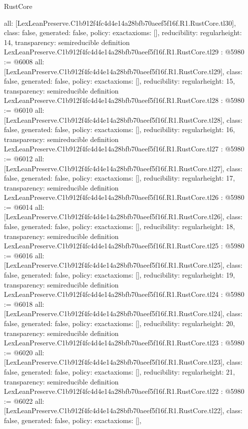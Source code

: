 \begin{lexlean}{RustCore}
\begin{coremodule}
{  all: [LexLeanPreserve.C1b912f4fc4d4e14a28bfb70aeef5f16f.R1.RustCore.tl30],
  class: false,
  generated: false,
  policy: exact{axioms: []},
  reducibility: regular{height: 14},
  transparency: semireducible
}
definition LexLeanPreserve.C1b912f4fc4d4e14a28bfb70aeef5f16f.R1.RustCore.tl29 : @5980 := @6008 {
  all: [LexLeanPreserve.C1b912f4fc4d4e14a28bfb70aeef5f16f.R1.RustCore.tl29],
  class: false,
  generated: false,
  policy: exact{axioms: []},
  reducibility: regular{height: 15},
  transparency: semireducible
}
definition LexLeanPreserve.C1b912f4fc4d4e14a28bfb70aeef5f16f.R1.RustCore.tl28 : @5980 := @6010 {
  all: [LexLeanPreserve.C1b912f4fc4d4e14a28bfb70aeef5f16f.R1.RustCore.tl28],
  class: false,
  generated: false,
  policy: exact{axioms: []},
  reducibility: regular{height: 16},
  transparency: semireducible
}
definition LexLeanPreserve.C1b912f4fc4d4e14a28bfb70aeef5f16f.R1.RustCore.tl27 : @5980 := @6012 {
  all: [LexLeanPreserve.C1b912f4fc4d4e14a28bfb70aeef5f16f.R1.RustCore.tl27],
  class: false,
  generated: false,
  policy: exact{axioms: []},
  reducibility: regular{height: 17},
  transparency: semireducible
}
definition LexLeanPreserve.C1b912f4fc4d4e14a28bfb70aeef5f16f.R1.RustCore.tl26 : @5980 := @6014 {
  all: [LexLeanPreserve.C1b912f4fc4d4e14a28bfb70aeef5f16f.R1.RustCore.tl26],
  class: false,
  generated: false,
  policy: exact{axioms: []},
  reducibility: regular{height: 18},
  transparency: semireducible
}
definition LexLeanPreserve.C1b912f4fc4d4e14a28bfb70aeef5f16f.R1.RustCore.tl25 : @5980 := @6016 {
  all: [LexLeanPreserve.C1b912f4fc4d4e14a28bfb70aeef5f16f.R1.RustCore.tl25],
  class: false,
  generated: false,
  policy: exact{axioms: []},
  reducibility: regular{height: 19},
  transparency: semireducible
}
definition LexLeanPreserve.C1b912f4fc4d4e14a28bfb70aeef5f16f.R1.RustCore.tl24 : @5980 := @6018 {
  all: [LexLeanPreserve.C1b912f4fc4d4e14a28bfb70aeef5f16f.R1.RustCore.tl24],
  class: false,
  generated: false,
  policy: exact{axioms: []},
  reducibility: regular{height: 20},
  transparency: semireducible
}
definition LexLeanPreserve.C1b912f4fc4d4e14a28bfb70aeef5f16f.R1.RustCore.tl23 : @5980 := @6020 {
  all: [LexLeanPreserve.C1b912f4fc4d4e14a28bfb70aeef5f16f.R1.RustCore.tl23],
  class: false,
  generated: false,
  policy: exact{axioms: []},
  reducibility: regular{height: 21},
  transparency: semireducible
}
definition LexLeanPreserve.C1b912f4fc4d4e14a28bfb70aeef5f16f.R1.RustCore.tl22 : @5980 := @6022 {
  all: [LexLeanPreserve.C1b912f4fc4d4e14a28bfb70aeef5f16f.R1.RustCore.tl22],
  class: false,
  generated: false,
  policy: exact{axioms: []},
}
\end{coremodule}
\end{lexlean}
